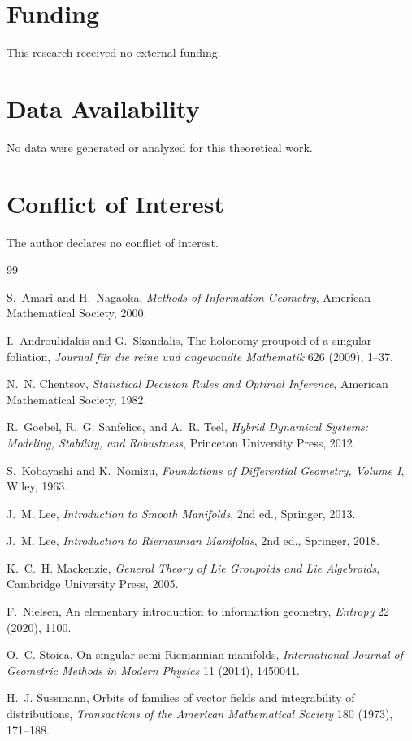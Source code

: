 \documentclass[11pt]{article}
\begin{document}
\section*{Funding}

This research received no external funding.

\section*{Data Availability}

No data were generated or analyzed for this theoretical work.

\section*{Conflict of Interest}

The author declares no conflict of interest.

\begin{thebibliography}{99}

S.~Amari and H.~Nagaoka,
\emph{Methods of Information Geometry},
American Mathematical Society, 2000.

I.~Androulidakis and G.~Skandalis,
The holonomy groupoid of a singular foliation,
\emph{Journal f\"ur die reine und angewandte Mathematik}
626 (2009), 1--37.

N.~N. Chentsov,
\emph{Statistical Decision Rules and Optimal Inference},
American Mathematical Society, 1982.

R.~Goebel, R.~G. Sanfelice, and A.~R. Teel,
\emph{Hybrid Dynamical Systems: Modeling, Stability, and Robustness},
Princeton University Press, 2012.

S.~Kobayashi and K.~Nomizu,
\emph{Foundations of Differential Geometry, Volume I},
Wiley, 1963.

J.~M. Lee,
\emph{Introduction to Smooth Manifolds},
2nd ed., Springer, 2013.

J.~M. Lee,
\emph{Introduction to Riemannian Manifolds},
2nd ed., Springer, 2018.

K.~C.~H. Mackenzie,
\emph{General Theory of Lie Groupoids and Lie Algebroids},
Cambridge University Press, 2005.

F.~Nielsen,
An elementary introduction to information geometry,
\emph{Entropy} 22 (2020), 1100.

O.~C. Stoica,
On singular semi-Riemannian manifolds,
\emph{International Journal of Geometric Methods in Modern Physics}
11 (2014), 1450041.

H.~J. Sussmann,
Orbits of families of vector fields and integrability of distributions,
\emph{Transactions of the American Mathematical Society}
180 (1973), 171--188.

\end{thebibliography}
\end{document}
